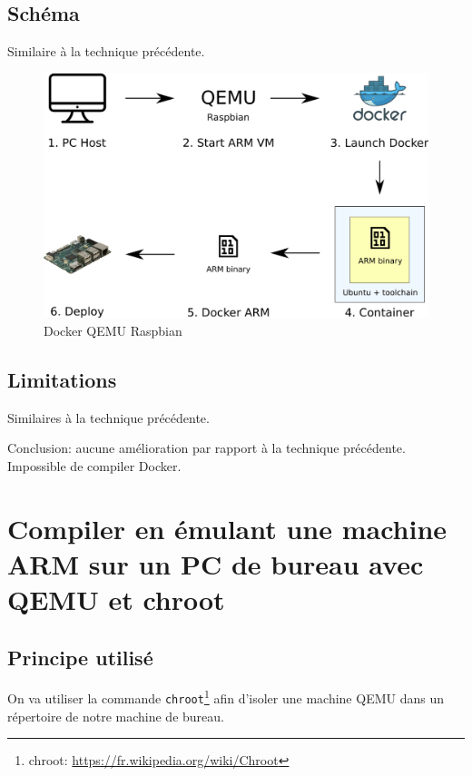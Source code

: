 \documentclass[11pt,a4paper,oneside]{report}
\newcommand{\code}[1]{\texttt{#1}} %
\begin{document}
\subsection{Schéma}

Similaire à la technique précédente.

\begin{figure}[H]
    \begin{center}
        \includegraphics[scale=0.5]{img/docker_qemu_raspbian}
    \end{center}
    \caption{Docker QEMU Raspbian}
    \label{fig_docker_qemu_raspbian}
\end{figure}

\subsection{Limitations}

Similaires à la technique précédente.

Conclusion: aucune amélioration par rapport à la technique précédente. Impossible de compiler Docker.



\section{Compiler en émulant une machine ARM sur un PC de bureau avec QEMU et chroot}

\subsection{Principe utilisé}

On va utiliser la commande \code{chroot}\footnote{chroot: \url{https://fr.wikipedia.org/wiki/Chroot}} afin d'isoler une machine QEMU dans un répertoire de notre machine de bureau.
\end{document}
